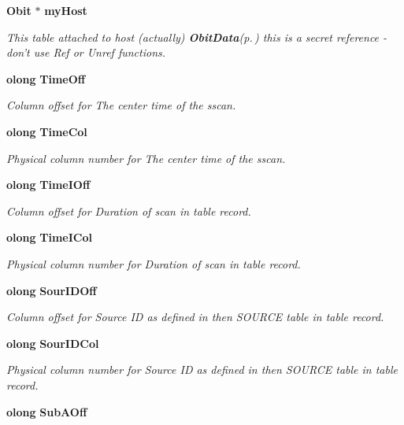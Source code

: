 \begin{CompactItemize}
{\bf Obit} $\ast$ {\bf my\-Host}
\begin{CompactList}\small\item\em This table attached to host (actually) {\bf Obit\-Data}{\rm (p.\,\pageref{structObitData})} this is a secret reference - don't use Ref or Unref functions. \item\end{CompactList}\item 
{\bf olong} {\bf Time\-Off}
\begin{CompactList}\small\item\em Column offset for The center time of the sscan. \item\end{CompactList}\item 
{\bf olong} {\bf Time\-Col}
\begin{CompactList}\small\item\em Physical column number for The center time of the sscan. \item\end{CompactList}\item 
{\bf olong} {\bf Time\-IOff}
\begin{CompactList}\small\item\em Column offset for Duration of scan in table record. \item\end{CompactList}\item 
{\bf olong} {\bf Time\-ICol}
\begin{CompactList}\small\item\em Physical column number for Duration of scan in table record. \item\end{CompactList}\item 
{\bf olong} {\bf Sour\-IDOff}
\begin{CompactList}\small\item\em Column offset for Source ID as defined in then SOURCE table in table record. \item\end{CompactList}\item 
{\bf olong} {\bf Sour\-IDCol}
\begin{CompactList}\small\item\em Physical column number for Source ID as defined in then SOURCE table in table record. \item\end{CompactList}\item 
{\bf olong} {\bf Sub\-AOff}

\end{CompactItemize}
